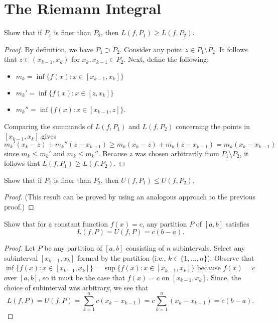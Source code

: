 \section{The Riemann Integral}

\begin{problem}
  Show that if $P_{1}$ is finer than $P_{2}$, then $L(f, P_{1}) \geq L(f, P_{2})$.

  \begin{proof}
    By definition, we have $P_{1} \supset P_{2}$. Consider any point $z \in P_{1} \setminus P_{2}$.
    It follows that $z \in (x_{k-1}, x_{k})$ for $x_{k}, x_{k-1} \in P_{2}$. Next, define the following:
    \begin{itemize}
      \item $m_{k} = \inf\{f(x) : x \in [x_{k-1}, x_{k}]\}$
      \item $m_{k}' = \inf\{f(x) : x \in [z, x_{k}]\}$
      \item $m_{k}'' = \inf\{f(x) : x \in [x_{k-1}, z]\}$.
    \end{itemize}
    Comparing the summands of $L(f, P_{1})$ and $L(f, P_{2})$ concerning the points in $[x_{k-1}, x_{k}]$ gives
    \[
      m_{k}'(x_{k} - z) + m_{k}''(z - x_{k-1}) \geq m_{k}(x_{k} - z) + m_{k}(z - x_{k-1}) = m_{k}(x_{k} - x_{k-1})
    \]
    since $m_{k} \leq m_{k}'$ and $m_{k} \leq m_{k}''$.
    Because $z$ was chosen arbitrarily from $P_{1} \setminus P_{2}$, it follows
    that $L(f, P_{1}) \geq L(f, P_{2})$.
  \end{proof}

\end{problem}

\begin{problem}
  Show that if $P_{1}$ is finer than $P_{2}$, then $U(f, P_{1}) \leq U(f, P_{2})$.
  
  \begin{proof}
    (This result can be proved by using an analogous approach to the previous proof.)
  \end{proof}

\end{problem}

\begin{problem}
  Show that for a constant function $f(x) = c$, any partition $P$ of $[a,b]$ satisfies
  \[
    L(f, P) = U(f, P) = c(b - a).
  \]
  
  \begin{proof}
    Let $P$ be any partition of $[a,b]$ consisting of $n$ subintervals. Select
    any subinterval $[x_{k-1}, x_{k}]$ formed by the partition (i.e., $k \in \{1, \ldots, n \}$).
    Observe that $\inf\{f(x) : x \in [x_{k-1}, x_{k}]\} = \sup\{f(x) : x \in [x_{k-1}, x_{k}]\}$
    because $f(x) = c$ over $[a, b]$, so it must be the case that $f(x) = c$ on $[x_{k-1}, x_{k}]$.
    Since, the choice of subinterval was arbitrary, we see that
    \[
      L(f, P) = U(f, P) = \sum_{k=1}^{n} c(x_{k} - x_{k-1}) = c \sum_{k=1}^{n} (x_{k} - x_{k-1}) = c(b - a).
    \]
  \end{proof}

\end{problem}

